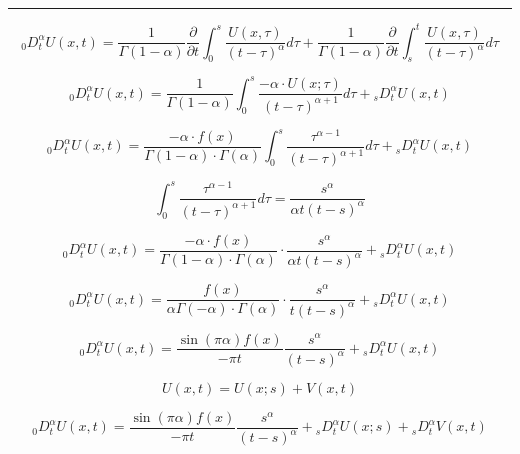 \documentclass[12pt, a4paper]{article}
\newcommand {\partt} {\frac{\partial}{\partial t}}
\begin{document}
\noindent\rule{\linewidth}{0.4pt}
	\begin{equation}
	{}_{0}D_{t}^{\alpha} U(x,t)  = \frac{1}{\Gamma(1-\alpha)} \partt \int_{0}^{s} \frac{U(x,\tau)}{(t-\tau)^{\alpha}}d\tau + \frac{1}{\Gamma(1-\alpha)} \partt \int_{s}^{t} \frac{U(x,\tau)}{(t-\tau)^{\alpha}}d\tau
	\end{equation}

	\begin{equation}
	{}_{0}D_{t}^{\alpha} U(x,t)  = \frac{1}{\Gamma(1-\alpha)} \int_{0}^{s} \frac{-\alpha \cdot U(x;\tau)}{(t-\tau)^{\alpha+1}}d\tau + {}_{s}D_{t}^{\alpha} U(x,t)
	\end{equation}

	\begin{equation}
	{}_{0}D_{t}^{\alpha} U(x,t)  = \frac{-\alpha\cdot f(x)}{\Gamma(1-\alpha)\cdot\Gamma(\alpha)} \int_{0}^{s} \frac{\tau^{\alpha-1}} {(t-\tau)^{\alpha+1}}d\tau
		+ {}_{s}D_{t}^{\alpha} U(x,t)
	\end{equation}

	\begin{equation}
	\int_{0}^{s} \frac{\tau^{\alpha-1}} {(t-\tau)^{\alpha+1}}d\tau =\frac{s^{\alpha}}{\alpha t (t-s)^{\alpha}}
	\end{equation}

	\begin{equation}
	{}_{0}D_{t}^{\alpha} U(x,t)  = \frac{-\alpha\cdot f(x)}{\Gamma(1-\alpha)\cdot\Gamma(\alpha)} \cdot \frac{s^{\alpha}}{\alpha t (t-s)^{\alpha}} + {}_{s}D_{t}^{\alpha} U(x,t)
	\end{equation}

	\begin{equation}
	{}_{0}D_{t}^{\alpha} U(x,t)  = \frac{f(x)}{\alpha\Gamma(-\alpha)\cdot\Gamma(\alpha)} \cdot \frac{s^{\alpha}}{t (t-s)^{\alpha}} + {}_{s}D_{t}^{\alpha} U(x,t)
	\end{equation}

	\begin{equation}
	{}_{0}D_{t}^{\alpha} U(x,t)  = \frac{\sin(\pi \alpha)f(x)}{- \pi t} \frac{s^{\alpha}}{(t-s)^{\alpha}} + {}_{s}D_{t}^{\alpha} U(x,t)
	\end{equation}

	\begin{equation}
	U(x,t) = U(x;s) + V(x,t)
	\end{equation}

	\begin{equation}
	{}_{0}D_{t}^{\alpha} U(x,t)  = \frac{\sin(\pi \alpha)f(x)}{- \pi t} \frac{s^{\alpha}}{(t-s)^{\alpha}} + {}_{s}D_{t}^{\alpha} U(x;s) + {}_{s}D_{t}^{\alpha} V(x,t)
	\end{equation}
\end{document}
